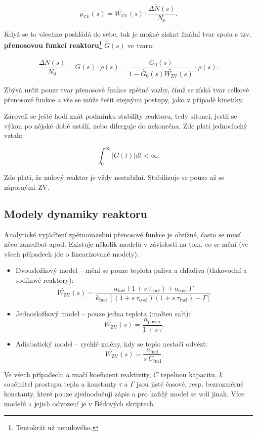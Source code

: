 $$ \tilde{\rho_\text{ZV}}(s) = \tilde{W_\text{ZV}}(s) \cdot \dfrac{\Delta \tilde{N}(s)}{N_0}. $$

Když se to všechno poskládá do sebe, tak je možné získat finální tvar spolu s tzv. \textbf{přenosovou funkcí reaktoru}\footnote{Tentokrát už nenulového.} $\tilde{G}(s)$ ve tvaru:

\begin{equation}
  \boxed{
    \dfrac{\Delta \tilde{N}(s)}{N_0} = \tilde{G}(s) \cdot \tilde{\rho}(s) = \dfrac{\tilde{G_0}(s)}{1 - \tilde{G_0}(s) \tilde{W_\text{ZV}}(s)} \cdot \tilde{\rho}(s).
  }
\end{equation}

Zbývá určit pouze tvar přenosové funkce zpětné vazby, čímž se získá tvar celkové přenosové funkce a vše se může řešit stejnými postupy, jako v případě kinetiky.

Zároveň se ještě hodí znát podmínku stability reaktoru, tedy situaci, jestli se výkon po nějaké době ustálí, nebo diferguje do nekonečna. Zde platí jednoduchý vztah:

\begin{equation}
  \boxed{
    \int_0^\infty  |G(t)| dt < \infty.
  }
\end{equation}

Zde platí, že nulový reaktor je vždy nestabilní. Stabilizuje se pouze až se zápornými ZV.

\subsection{Modely dynamiky reaktoru}

Analytické vyjádření zpětnovazební přenosové funkce je obtížné, často se musí něco zanedbat apod. Existuje několik modelů v závislosti na tom, co se mění (ve všech případech jde o linearizované modely):

\begin{itemize}
  \item Dvousložkový model -- mění se pouze teplota paliva a chladiva (tlakovodní a sodíkové reaktory):\\
  $$ \tilde{W_\text{ZV}}(s) = \dfrac{a_\text{fuel} (1 + s \: \tau_\text{cool}) + a_\text{cool} \: \Gamma}{k_\text{fuel} \: [(1 + s \: \tau_\text{cool})(1 + s \: \tau_\text{fuel}) - \Gamma]} $$
  \item Jednosložkový model -- pouze jedna teplota (molten salt):\\
  $$ \tilde{W_\text{ZV}}(s) = \dfrac{a_\text{power}}{1 + s \: \tau}. $$
  \item Adiabatický model -- rychlé změny, kdy se teplo nestačí odvézt:\\
  $$ \tilde{W_\text{ZV}}(s) = \dfrac{a_\text{fuel}}{s \: C_\text{fuel}}. $$
\end{itemize}

Ve všech případech: $a$ značí koeficient reaktivity, $C$ tepelnou kapacitu, $k$ součinitel prostupu tepla a konstanty $\tau$ a $\Gamma$ jsou jisté časové, resp. bezrozměrné konstanty, které pouze zjednodušují zápis a pro každý model se volí jinak. Více modelů a jejich odvození je v Bédových skriptech.

